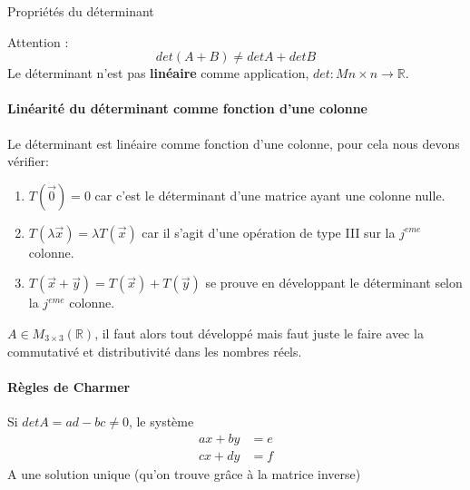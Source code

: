 \begin{parag}{Propriétés du déterminant}
\begin{framedremark}
    
        Attention : \[ det(A + B) \neq det A + det B\]
        Le déterminant n'est pas \textbf{linéaire} comme application, $det : M{n\times n} \to \mathbb{R}$.
    
    \end{framedremark}
\end{parag}

    \paragraph{Linéarité du déterminant comme fonction \textbf{d'une colonne}}
    Le déterminant est linéaire comme fonction d'une colonne, pour cela nous devons vérifier:
    \begin{enumerate}
        \item $T(\vec{0}) = 0$ car c'est le déterminant d'une matrice ayant une colonne nulle.
        \item $T(\lambda\vec{x}) = \lambda T(\vec{x})$ car il s'agit d'une opération de type III sur la $j^{eme}$ colonne.
        \item $T(\vec{x}+ \vec{y}) = T(\vec{x}) + T(\vec{y})$ se prouve en développant le déterminant selon la $j^{eme}$ colonne.

    \end{enumerate}


    $A  \in M_{3\times3}(\mathbb{R})$, il faut alors tout développé mais faut juste le faire avec la commutativé et distributivité dans les nombres réels.

    \paragraph{Règles de Charmer}
    \begin{theoreme}
    Si $det A = ad-bc \neq 0$, le système
    \begin{align*}
        ax + by &= e\\
        cx + dy &= f
    \end{align*}
    A une solution unique (qu'on trouve grâce à la matrice inverse)
    \end{theoreme}
    \\
    

